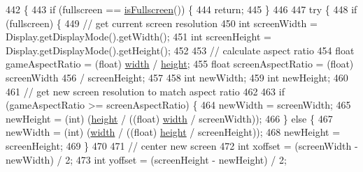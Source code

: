 \begin{DoxyCode}
442                                                                           \{
443          \textcolor{keywordflow}{if} (fullscreen == \mbox{\hyperlink{classorg_1_1newdawn_1_1slick_1_1_applet_game_container_1_1_container_aaa2fdeeb3fc168eb5cb44befe9194243}{isFullscreen}}()) \{
444             \textcolor{keywordflow}{return};
445          \}
446 
447          \textcolor{keywordflow}{try} \{
448             \textcolor{keywordflow}{if} (fullscreen) \{
449                \textcolor{comment}{// get current screen resolution}
450                \textcolor{keywordtype}{int} screenWidth = Display.getDisplayMode().getWidth();
451                \textcolor{keywordtype}{int} screenHeight = Display.getDisplayMode().getHeight();
452 
453                \textcolor{comment}{// calculate aspect ratio}
454                \textcolor{keywordtype}{float} gameAspectRatio = (float) \mbox{\hyperlink{classorg_1_1newdawn_1_1slick_1_1_game_container_a8c65160202b9f5aafde3fcf03e6155c9}{width}} / \mbox{\hyperlink{classorg_1_1newdawn_1_1slick_1_1_game_container_aac7312a21bbcaabec14be965c683d970}{height}};
455                \textcolor{keywordtype}{float} screenAspectRatio = (float) screenWidth
456                      / screenHeight;
457 
458                \textcolor{keywordtype}{int} newWidth;
459                \textcolor{keywordtype}{int} newHeight;
460 
461                \textcolor{comment}{// get new screen resolution to match aspect ratio}
462 
463                \textcolor{keywordflow}{if} (gameAspectRatio >= screenAspectRatio) \{
464                   newWidth = screenWidth;
465                   newHeight = (int) (\mbox{\hyperlink{classorg_1_1newdawn_1_1slick_1_1_game_container_aac7312a21bbcaabec14be965c683d970}{height}} / ((\textcolor{keywordtype}{float}) \mbox{\hyperlink{classorg_1_1newdawn_1_1slick_1_1_game_container_a8c65160202b9f5aafde3fcf03e6155c9}{width}} / screenWidth));
466                \} \textcolor{keywordflow}{else} \{
467                   newWidth = (int) (\mbox{\hyperlink{classorg_1_1newdawn_1_1slick_1_1_game_container_a8c65160202b9f5aafde3fcf03e6155c9}{width}} / ((\textcolor{keywordtype}{float}) \mbox{\hyperlink{classorg_1_1newdawn_1_1slick_1_1_game_container_aac7312a21bbcaabec14be965c683d970}{height}} / screenHeight));
468                   newHeight = screenHeight;
469                \}
470 
471                \textcolor{comment}{// center new screen}
472                \textcolor{keywordtype}{int} xoffset = (screenWidth - newWidth) / 2;
473                \textcolor{keywordtype}{int} yoffset = (screenHeight - newHeight) / 2;

\end{DoxyCode}

